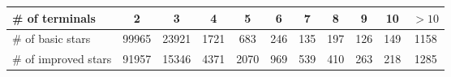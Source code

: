 \begin{tabular}{l|cccccccccc}
  \# of terminals  & 2 & 3 & 4 & 5 & 6 & 7 & 8 & 9 & 10 & $>10$ \\ \hline
  \# of basic stars  & 99965 & 23921 & 1721 & 683 & 246 & 135 & 197 & 126 & 149 & 1158 \\
  \# of improved stars  & 91957 & 15346 & 4371 & 2070 & 969 & 539 & 410 & 263 & 218 & 1285
\end{tabular}
